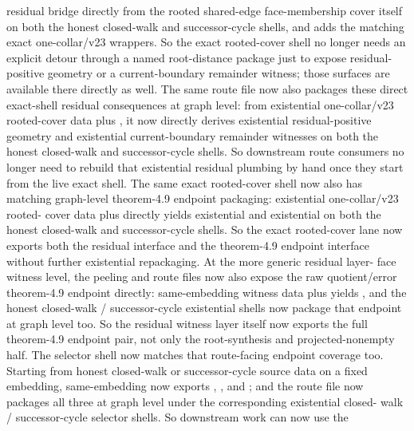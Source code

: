 \documentclass[11pt]{article}
\begin{document}
\begin{itemize}
residual bridge directly from the rooted shared-edge face-membership cover
itself on both the honest closed-walk and successor-cycle shells, and
 adds the matching exact
one-collar/v23 wrappers.  So the exact rooted-cover shell no longer needs an
explicit detour through a named root-distance package just to expose residual-
positive geometry or a current-boundary remainder witness; those surfaces are
available there directly as well.  The same route file now also packages these
direct exact-shell residual consequences at graph level: from existential
one-collar/v23 rooted-cover data plus , it
now directly derives existential residual-positive geometry and existential
current-boundary remainder witnesses on both the honest closed-walk and
successor-cycle shells.  So downstream route consumers no longer need to
rebuild that existential residual plumbing by hand once they start from the
live exact shell.  The same exact rooted-cover shell now also has matching
graph-level theorem-4.9 endpoint packaging: existential one-collar/v23 rooted-
cover data plus  directly yields
existential  and
existential  on both the honest
closed-walk and successor-cycle shells.  So the exact rooted-cover lane now
exports both the residual interface and the theorem-4.9 endpoint interface
without further existential repackaging.  At the more generic residual layer-
face witness level, the peeling and route files now also expose the raw
quotient/error theorem-4.9 endpoint directly: same-embedding witness data plus
 yields
, and the honest closed-walk /
successor-cycle existential shells now package that endpoint at graph level
too.  So the residual witness layer itself now exports the full theorem-4.9
endpoint pair, not only the root-synthesis and projected-nonempty half.  The
selector shell now matches that route-facing endpoint coverage too.  Starting
from honest closed-walk or successor-cycle source data on a fixed embedding,
same-embedding  now exports
,
, and
; and the route file now
packages all three at graph level under the corresponding existential closed-
walk / successor-cycle selector shells.  So downstream work can now use the

\end{itemize}
\end{document}
